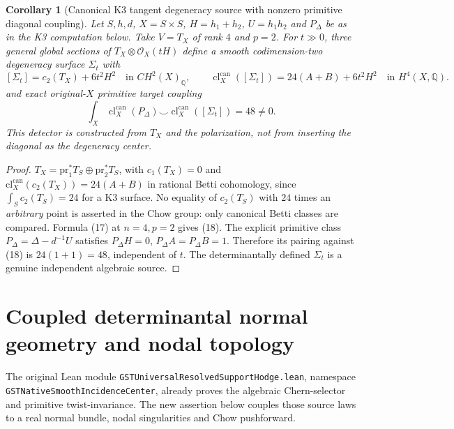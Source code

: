 \documentclass[11pt]{article}
\newtheorem{corollary}{Corollary}
\begin{document}
\begin{corollary}[Canonical K3 tangent degeneracy source with nonzero
primitive diagonal coupling]
Let $S,h,d$, $X=S\times S$, $H=h_1+h_2$, $U=h_1h_2$
and $P_\Delta$ be as in the K3 computation below.
Take $V=T_X$ of rank $4$ and $p=2$.
For $t\gg0$, three general global sections of
$T_X\otimes\mathcal O_X(tH)$ define a smooth
codimension-two degeneracy surface $\Sigma_t$ with
\[
 \boxed{[\Sigma_t]=c_2(T_X)+6t^2H^2
 \quad\text{in }CH^2(X)_{\mathbb Q},\qquad
 \operatorname{cl}_X^{\mathrm{can}}([\Sigma_t])
 =24(A+B)+6t^2H^2\quad\text{in }H^4(X,\mathbb Q).}
                                                            \tag{18}
\]
and exact original-$X$ primitive target coupling
\[
 \boxed{
 \int_X \operatorname{cl}^{\mathrm{can}}_X(P_\Delta)
       \smile\operatorname{cl}^{\mathrm{can}}_X([\Sigma_t])
   =48\ne0.}                                             \tag{19}
\]
This detector is constructed from $T_X$ and the polarization,
\emph{not} from inserting the diagonal as the degeneracy center.
\end{corollary}
\begin{proof}
$T_X=\mathrm{pr}_1^*T_S\oplus\mathrm{pr}_2^*T_S$,
with $c_1(T_X)=0$ and
$\mathrm{cl}^{\mathrm{can}}_X(c_2(T_X))=24(A+B)$
in rational Betti cohomology, since
$\int_Sc_2(T_S)=24$ for a K3 surface.
No equality of $c_2(T_S)$ with $24$ times an
\emph{arbitrary} point is asserted in the Chow group:
only canonical Betti classes are compared.
Formula (17) at $n=4,p=2$ gives (18).
The explicit primitive class $P_\Delta=\Delta-d^{-1}U$
satisfies $P_\Delta H=0$, $P_\Delta A=P_\Delta B=1$.
Therefore its pairing against (18) is $24(1+1)=48$,
independent of $t$. The determinantally defined
$\Sigma_t$ is a genuine independent algebraic source.
\end{proof}


\section{Coupled determinantal normal geometry and nodal topology}
The original Lean module \texttt{GSTUniversalResolvedSupportHodge.lean},
namespace \texttt{GSTNativeSmoothIncidenceCenter}, already proves
the algebraic Chern-selector and primitive twist-invariance.
The new assertion below couples those source laws to a
real normal bundle, nodal singularities and Chow pushforward.
\end{document}
